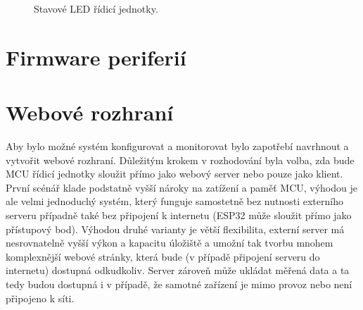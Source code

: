 \begin{figure}[h!]
            
            \caption{Stavové LED řídicí jednotky.}
            \label{fig:stavove-led-mainboard}
        \end{figure}

    \subsection{}



\section{Firmware periferií}
\section{Webové rozhraní}
    Aby bylo možné systém konfigurovat a monitorovat bylo zapotřebí navrhnout a vytvořit webové rozhraní. Důležitým krokem v rozhodování byla volba, zda bude MCU řídicí jednotky sloužit přímo jako webový server nebo pouze jako klient. První scénář klade podstatně vyšší nároky na zatížení a paměť MCU, výhodou je ale velmi jednoduchý systém, který funguje samostetně bez nutnosti externího serveru případně také bez připojení k internetu (ESP32 může sloužit přímo jako přístupový bod). Výhodou druhé varianty je větší flexibilita, externí server má nesrovnatelně vyšší výkon a kapacitu úložiště a umožní tak tvorbu mnohem komplexnější webové stránky, která bude (v případě připojení serveru do internetu) dostupná odkudkoliv. Server zároveň může ukládat měřená data a ta tedy budou dostupná i v případě, že samotné zařízení je mimo provoz nebo není připojeno k síti.

